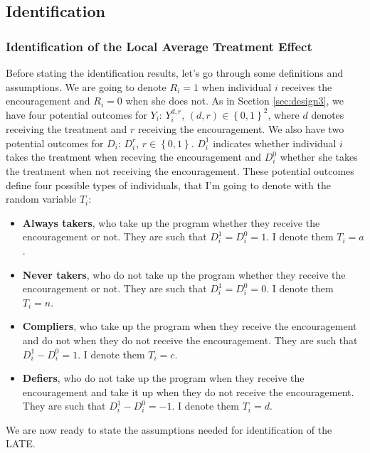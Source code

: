 \documentclass[]{book}
\providecommand{\tightlist}{%
  \setlength{\itemsep}{0pt}\setlength{\parskip}{0pt}}
\theoremstyle{definition}
\theoremstyle{definition}
\theoremstyle{definition}
\theoremstyle{remark}
\begin{document}
\subsection{Identification}\label{identification-3}

\subsubsection{Identification of the Local Average Treatment
Effect}\label{identification-of-the-local-average-treatment-effect}

Before stating the identification results, let's go through some
definitions and assumptions. We are going to denote \(R_i=1\) when
individual \(i\) receives the encouragement and \(R_i=0\) when she does
not. As in Section \ref{sec:design3}, we have four potential outcomes
for \(Y_i\): \(Y_i^{d,r}\), \((d,r)\in\left\{0,1\right\}^2\), where
\(d\) denotes receiving the treatment and \(r\) receiving the
encouragement. We also have two potential outcomes for \(D_i\):
\(D_i^{r}\), \(r\in\left\{0,1\right\}\). \(D_i^{1}\) indicates whether
individual \(i\) takes the treatment when receving the encouragement and
\(D_i^{0}\) whether she takes the treatment when not receiving the
encouragement. These potential outcomes define four possible types of
individuals, that I'm going to denote with the random variable \(T_i\):

\begin{itemize}
\tightlist
\item
  \textbf{Always takers}, who take up the program whether they receive
  the encouragement or not. They are such that \(D_i^{1}=D_i^{0}=1\). I
  denote them \(T_i=a\).
\item
  \textbf{Never takers}, who do not take up the program whether they
  receive the encouragement or not. They are such that
  \(D_i^{1}=D_i^{0}=0\). I denote them \(T_i=n\).
\item
  \textbf{Compliers}, who take up the program when they receive the
  encouragement and do not when they do not receive the encouragement.
  They are such that \(D_i^{1}-D_i^{0}=1\). I denote them \(T_i=c\).
\item
  \textbf{Defiers}, who do not take up the program when they receive the
  encouragement and take it up when they do not receive the
  encouragement. They are such that \(D_i^{1}-D_i^{0}=-1\). I denote
  them \(T_i=d\).
\end{itemize}

We are now ready to state the assumptions needed for identification of
the LATE.
\end{document}
